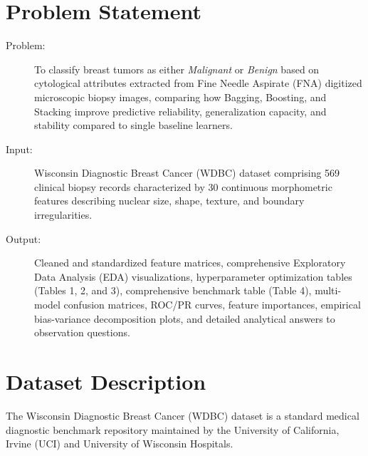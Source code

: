 \documentclass[12pt,a4paper]{article}
\begin{document}
\section{Problem Statement}
\begin{description}
    \item[Problem:] To classify breast tumors as either \textit{Malignant} or \textit{Benign} based on cytological attributes extracted from Fine Needle Aspirate (FNA) digitized microscopic biopsy images, comparing how Bagging, Boosting, and Stacking improve predictive reliability, generalization capacity, and stability compared to single baseline learners.
    \item[Input:] Wisconsin Diagnostic Breast Cancer (WDBC) dataset comprising 569 clinical biopsy records characterized by 30 continuous morphometric features describing nuclear size, shape, texture, and boundary irregularities.
    \item[Output:] Cleaned and standardized feature matrices, comprehensive Exploratory Data Analysis (EDA) visualizations, hyperparameter optimization tables (Tables 1, 2, and 3), comprehensive benchmark table (Table 4), multi-model confusion matrices, ROC/PR curves, feature importances, empirical bias-variance decomposition plots, and detailed analytical answers to observation questions.
\end{description}

\section{Dataset Description}
The Wisconsin Diagnostic Breast Cancer (WDBC) dataset is a standard medical diagnostic benchmark repository maintained by the University of California, Irvine (UCI) and University of Wisconsin Hospitals.
\end{document}
